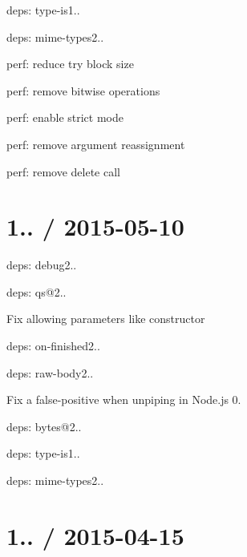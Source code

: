 \begin{DoxyItemize}
\begin{DoxyItemize}
\end{DoxyItemize}
\item deps\+: type-\/is1..
\begin{DoxyItemize}
\item deps\+: mime-\/types2..
\item perf\+: reduce try block size
\item perf\+: remove bitwise operations
\end{DoxyItemize}
\item perf\+: enable strict mode
\item perf\+: remove argument reassignment
\item perf\+: remove delete call
\end{DoxyItemize}

\section*{1.. / 2015-\/05-\/10 }


\begin{DoxyItemize}
\item deps\+: debug2..
\item deps\+: qs@2..
\begin{DoxyItemize}
\item Fix allowing parameters like {\ttfamily constructor}
\end{DoxyItemize}
\item deps\+: on-\/finished2..
\item deps\+: raw-\/body2..
\begin{DoxyItemize}
\item Fix a false-\/positive when unpiping in Node.\+js 0.
\item deps\+: bytes@2..
\end{DoxyItemize}
\item deps\+: type-\/is1..
\begin{DoxyItemize}
\item deps\+: mime-\/types2..
\end{DoxyItemize}
\end{DoxyItemize}

\section*{1.. / 2015-\/04-\/15 }


